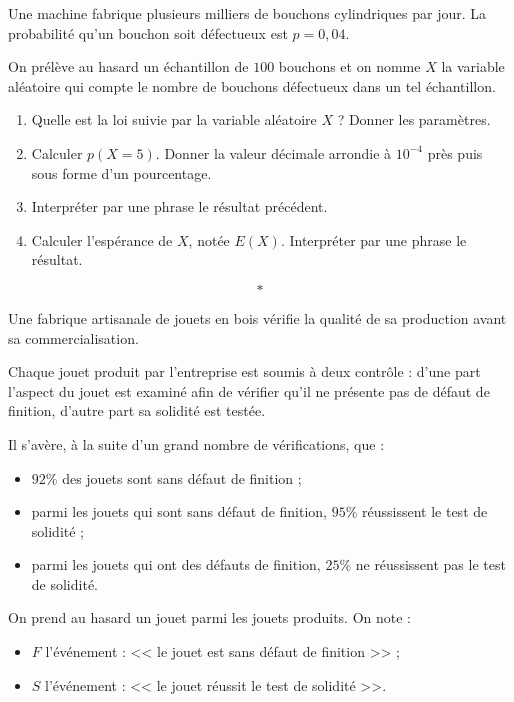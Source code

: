 \documentclass[10pt,openright,twoside,french]{book}
\begin{document}

\exo Une machine fabrique plusieurs milliers de bouchons cylindriques par jour.
La probabilité qu'un bouchon soit défectueux est $p = 0,04$.\par
On prélève au hasard un échantillon de $100$ bouchons et on nomme $X$ la variable aléatoire qui compte le nombre de bouchons défectueux dans un tel échantillon.

\begin{enumerate}
    \item Quelle est la loi suivie par la variable aléatoire $X$ ? Donner les paramètres.
    \item Calculer $p(X = 5)$. Donner la valeur décimale arrondie à $10^{-4}$ près puis sous forme d'un pourcentage.
    \item Interpréter par une phrase le résultat précédent.
    \item Calculer l'espérance de $X$, notée $E(X)$. Interpréter par une phrase le résultat.
\end{enumerate}\[*\]

\exo Une fabrique artisanale de jouets en bois vérifie la qualité de sa production avant sa commercialisation.\par
Chaque jouet produit par l'entreprise est soumis à deux contrôle : d'une part l'aspect du jouet est examiné afin de vérifier qu'il ne présente pas de défaut de finition, d'autre part sa solidité est testée.\par\medskip

Il s'avère, à la suite d'un grand nombre de vérifications, que :
\begin{itemize}[label=\textbullet]
    \item $92\%$ des jouets sont sans défaut de finition ;
    \item parmi les jouets qui sont sans défaut de finition, $95\%$ réussissent le test de solidité ;
    \item parmi les jouets qui ont des défauts de finition, $25\%$ ne réussissent pas le test de solidité.
\end{itemize}\medskip

On prend au hasard un jouet parmi les jouets produits. On note :
\begin{itemize}[label=\textbullet]
    \item $F$ l'événement : << le jouet est sans défaut de finition >> ;
    \item $S$ l'événement : << le jouet réussit le test de solidité >>.
\end{itemize}\medskip
\end{document}
